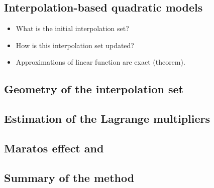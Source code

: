 \subsection{Interpolation-based quadratic models}
\label{subsec:cobyqa-models}

\begin{itemize}
    \item What is the initial interpolation set?
    \item How is this interpolation set updated?
    \item Approximations of linear function are exact (theorem).
\end{itemize}

\subsection{Geometry of the interpolation set}

\subsection{Estimation of the Lagrange multipliers}

\subsection{Maratos effect and }

\subsection{Summary of the method}
